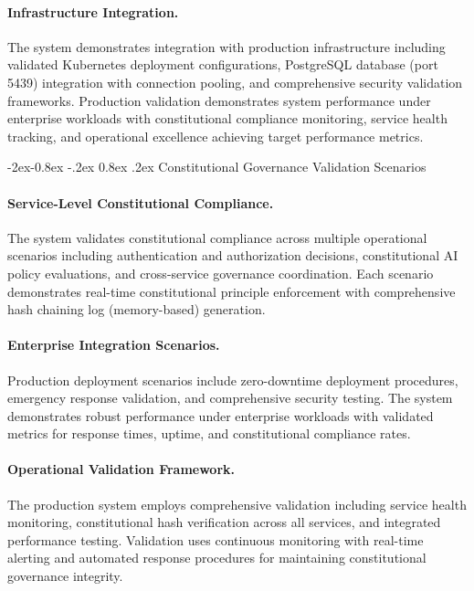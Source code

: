 \documentclass[manuscript,screen,9pt]{acmart}
\makeatletter
\renewcommand\subsubsection{\@startsection{subsubsection}{3}{\z@}%
  {-2ex\@plus -0.8ex \@minus -.2ex}%
  {0.8ex \@plus .2ex}%
  {\normalfont\normalsize\bfseries}}
\makeatother
\begin{document}
\begin{table}[!htb]
\paragraph{Infrastructure Integration.} The system demonstrates integration with production infrastructure including validated Kubernetes deployment configurations, PostgreSQL database (port 5439) integration with connection pooling, and comprehensive security validation frameworks. Production validation demonstrates system performance under enterprise workloads with constitutional compliance monitoring, service health tracking, and operational excellence achieving target performance metrics.

\subsubsection{Constitutional Governance Validation Scenarios}
\label{subsubsec:governance_scenarios}

\paragraph{Service-Level Constitutional Compliance.} The system validates constitutional compliance across multiple operational scenarios including authentication and authorization decisions, constitutional AI policy evaluations, and cross-service governance coordination. Each scenario demonstrates real-time constitutional principle enforcement with comprehensive hash chaining log (memory-based) generation.

\paragraph{Enterprise Integration Scenarios.} Production deployment scenarios include zero-downtime deployment procedures, emergency response validation, and comprehensive security testing. The system demonstrates robust performance under enterprise workloads with validated metrics for response times, uptime, and constitutional compliance rates.

\paragraph{Operational Validation Framework.} The production system employs comprehensive validation including service health monitoring, constitutional hash verification across all services, and integrated performance testing. Validation uses continuous monitoring with real-time alerting and automated response procedures for maintaining constitutional governance integrity.


\end{table}
\end{document}
